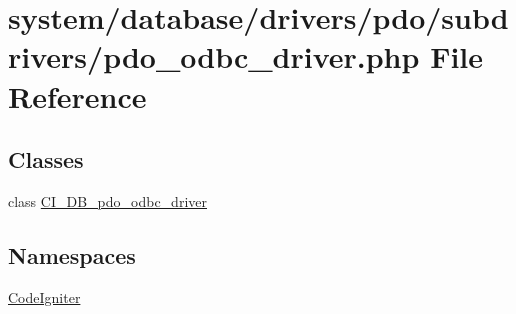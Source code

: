 \hypertarget{pdo__odbc__driver_8php}{}\section{system/database/drivers/pdo/subdrivers/pdo\+\_\+odbc\+\_\+driver.php File Reference}
\label{pdo__odbc__driver_8php}
\subsection*{Classes}
\begin{DoxyCompactItemize}
\item 
class \mbox{\hyperlink{class_c_i___d_b__pdo__odbc__driver}{C\+I\+\_\+\+D\+B\+\_\+pdo\+\_\+odbc\+\_\+driver}}
\end{DoxyCompactItemize}
\subsection*{Namespaces}
\begin{DoxyCompactItemize}
\item 
 \mbox{\hyperlink{namespace_code_igniter}{Code\+Igniter}}
\end{DoxyCompactItemize}
